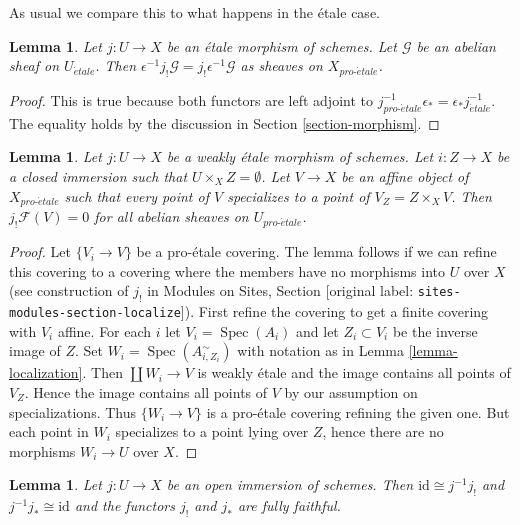 \documentclass[10pt,a4paper]{article}
\theoremstyle{plain}
\newtheorem{lemma}[subsection]{Lemma}
\theoremstyle{definition}
\theoremstyle{remark}
\numberwithin{equation}{subsection}
\def\Spec{\mathop{\mathrm{Spec}}}
\def\proetale{{pro\text{-}\acute{e}tale}}
\def\etale{{\acute{e}tale}}
\begin{document}
\noindent
As usual we compare this to what happens in the \'etale case.

\begin{lemma}
\label{lemma-jshriek-comparison}
Let $j : U \to X$ be an \'etale morphism of schemes.
Let $\mathcal{G}$ be an abelian sheaf on $U_\etale$.
Then $\epsilon^{-1} j_!\mathcal{G} = j_!\epsilon^{-1}\mathcal{G}$
as sheaves on $X_\proetale$.
\end{lemma}

\begin{proof}
This is true because both functors are left adjoint to
$j_\proetale^{-1} \epsilon_* = \epsilon_* j_\etale^{-1}$.
The equality holds by the discussion in Section \ref{section-morphism}.
\end{proof}

\begin{lemma}
\label{lemma-jshriek-zero}
Let $j : U \to X$ be a weakly \'etale morphism of schemes.
Let $i : Z \to X$ be a closed immersion such that $U \times_X Z = \emptyset$.
Let $V \to X$ be an affine object of $X_\proetale$ such that every point
of $V$ specializes to a point of $V_Z = Z \times_X V$.
Then $j_!\mathcal{F}(V) = 0$ for all abelian sheaves on $U_\proetale$.
\end{lemma}

\begin{proof}
Let $\{V_i \to V\}$ be a pro-\'etale covering. The lemma follows if we
can refine this covering to a covering where the members have no
morphisms into $U$ over $X$ (see construction of $j_!$ in
Modules on Sites, Section \textnormal{[original label: \nolinkurl{sites-modules-section-localize}]}).
First refine the covering to get a finite covering with $V_i$ affine.
For each $i$ let $V_i = \Spec(A_i)$ and let $Z_i \subset V_i$ be the
inverse image of $Z$.
Set $W_i = \Spec(A_{i, Z_i}^\sim)$ with notation as in
Lemma \ref{lemma-localization}.
Then $\coprod W_i \to V$ is weakly \'etale and the image contains all
points of $V_Z$. Hence the image contains all points of $V$ by
our assumption on specializations. Thus $\{W_i \to V\}$ is a
pro-\'etale covering refining the given one. But each point in $W_i$
specializes to a point lying over $Z$, hence there are no morphisms
$W_i \to U$ over $X$.
\end{proof}

\begin{lemma}
\label{lemma-open-immersion}
Let $j : U \to X$ be an open immersion of schemes.
Then $\text{id} \cong j^{-1}j_!$ and $j^{-1}j_* \cong \text{id}$
and the functors $j_!$ and $j_*$ are fully faithful.
\end{lemma}
\end{document}
